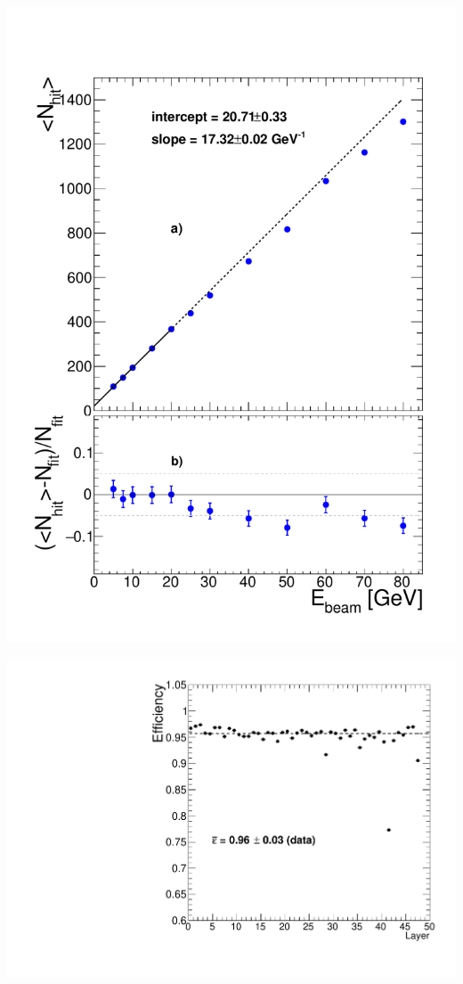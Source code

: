\documentclass[8pt]{beamer}
\begin{document}
  \begin{frame}
  \frametitle{\secname}
  \framesubtitle{\subsecname}
    \begin{minipage}{0.48\linewidth}
      \includegraphics[width=1.2\linewidth]{NHITPION.pdf}
    \end{minipage} \hfill
    \begin{minipage}{0.48\linewidth}
      \begin{center}
        \includegraphics[width=0.7\linewidth]{eff_2012.pdf} \\

\end{center}
\end{minipage}
\end{frame}
\end{document}

